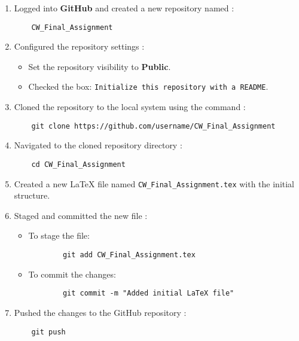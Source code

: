 \documentclass[12pt]{article}
\begin{document}
\begin{enumerate}
    \item Logged into \textbf{GitHub} and created a new repository named :
    \begin{verbatim}
    CW_Final_Assignment
    \end{verbatim}

    \item Configured the repository settings :
    \begin{itemize}
        \item Set the repository visibility to \textbf{Public}.
        \item Checked the box: \texttt{Initialize this repository with a README}.
    \end{itemize}

    \item Cloned the repository to the local system using the command :
    \begin{verbatim}
    git clone https://github.com/username/CW_Final_Assignment
    \end{verbatim}

    \item Navigated to the cloned repository directory :
    \begin{verbatim}
    cd CW_Final_Assignment
    \end{verbatim}

    \item Created a new LaTeX file named \texttt{CW\_Final\_Assignment.tex} with the initial structure.

    \item Staged and committed the new file :
    \begin{itemize}
        \item To stage the file:
        \begin{verbatim}
        git add CW_Final_Assignment.tex
        \end{verbatim}
        \item To commit the changes:
        \begin{verbatim}
        git commit -m "Added initial LaTeX file"
        \end{verbatim}
    \end{itemize}

    \item Pushed the changes to the GitHub repository :
    \begin{verbatim}
    git push
    \end{verbatim}
\end{enumerate}
\end{document}
